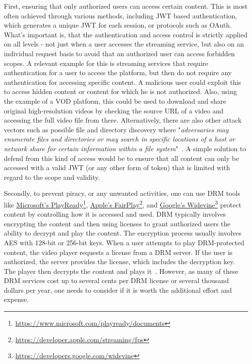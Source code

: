 First, ensuring that only authorized users can access certain content. This is most often achieved through various methods, including \ac{JWT} based authentication, which generates a unique \ac{JWT} for each session, or protocols such as OAuth. What's important is, that the authentication and access control is strictly applied on all levels - not just when a user accesses the streaming service, but also on an individual request basis to avoid that an authorized user can access forbidden scopes. A relevant example for this is streaming services that require authentication for a user to access the platform, but then do not require any authentication for accessing specific content. A malicious user could exploit this to access hidden content or content for which he is not authorized. Also, using the example of a \ac{VOD} platform, this could be used to download and share original high-resolution videos by checking the source URL of a video and accessing the full video file from there.
Alternatively, there are also other attack vectors such as possible file and directory discovery where "\textit{adversaries may enumerate files and directories or may search in specific locations of a host or network share for certain information within a file system}"~\parencite{mitre}. A simple solution to defend from this kind of access would be to ensure that all content can only be accessed with a valid \ac{JWT} (or any other form of token) that is limited with regard to the scope and validity.

Secondly, to prevent piracy, or any unwanted activities, one can use \ac{DRM} tools like \href{https://www.microsoft.com/playready/documents}{Microsoft's PlayReady}\footnote{\url{https://www.microsoft.com/playready/documents}}, \href{https://developer.apple.com/streaming/fps}{Apple's FairPlay}\footnote{\url{https://developer.apple.com/streaming/fps}}, and \href{https://developers.google.com/widevine}{Google's Widevine}\footnote{\url{https://developers.google.com/widevine}} protect content by controlling how it is accessed and used. \ac{DRM} typically involves encrypting the content and then using licenses to grant authorized users the ability to decrypt and play the content. The encryption process usually involves \ac{AES} with 128-bit or 256-bit keys. When a user attempts to play \ac{DRM}-protected content, the video player requests a license from a \ac{DRM} server. If the user is authorized, the server provides the license, which includes the decryption key. The player then decrypts the content and plays it~\parencite{drm}. However, as many of these \ac{DRM} services cost up to several cents per \ac{DRM} license or several thousand dollars per year, one needs to consider if it is worth the additional effort and expense.

